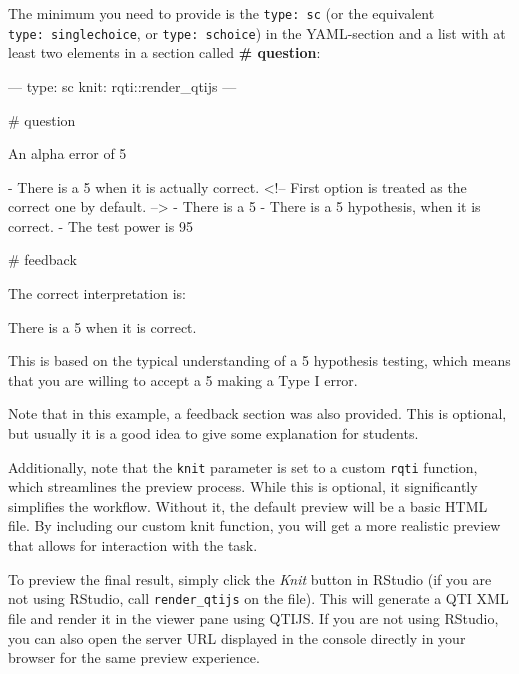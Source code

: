 \documentclass[twoside]{tufte-book}
\newenvironment{Shaded}{}{}
\begin{document}
The minimum you need to provide is the \texttt{type:\ sc} (or the equivalent \texttt{type:\ singlechoice}, or \texttt{type:\ schoice}) in the YAML-section and a list with at least two elements in a section called \textbf{\# question}:

\begin{Shaded}
\begin{Highlighting}
---
type: sc
knit: rqti::render_qtijs
---

# question

An alpha error of 5%

- There is a 5%
when it is actually correct. <!-- First option is treated as the correct one by
default. -->
- There is a 5%
- There is a 5%
hypothesis, when it is correct.
- The test power is 95%

# feedback

The correct interpretation is:

There is a 5%
when it is correct.

This is based on the typical understanding of a 5%
hypothesis testing, which means that you are willing to accept a 5%
making a Type I error.
\end{Highlighting}
\end{Shaded}

Note that in this example, a feedback section was also provided. This is optional, but usually it is a good idea to give some explanation for students.

Additionally, note that the \texttt{knit} parameter is set to a custom \texttt{rqti} function, which streamlines the preview process. While this is optional, it significantly simplifies the workflow. Without it, the default preview will be a basic HTML file. By including our custom knit function, you will get a more realistic preview that allows for interaction with the task.

To preview the final result, simply click the \emph{Knit} button in RStudio (if you are not using RStudio, call \texttt{render\_qtijs} on the file). This will generate a QTI XML file and render it in the viewer pane using QTIJS. If you are not using RStudio, you can also open the server URL displayed in the console directly in your browser for the same preview experience.
\end{document}
